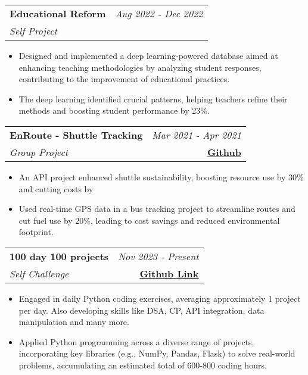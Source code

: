 \documentclass[a4paper,11pt]{article}
\makeatletter
\newcommand{\resumeProject}[4]{
\vspace{0.5mm}\item
    \begin{tabular*}{0.98\textwidth}[t]{l@{\extracolsep{\fill}}r}
        \textbf{#1} & \textit{\footnotesize{#3}} \\
        \footnotesize{\textit{#2}} & \footnotesize{#4}
    \end{tabular*}
    \vspace{-2.4mm}
}
\newcommand{\resumeItemListStart}{\begin{justify}\begin{itemize}[leftmargin=3ex, rightmargin=2ex, noitemsep,labelsep=1.2mm,itemsep=0mm]\small}
\newcommand{\resumeItemListEnd}{\end{itemize}\end{justify}\vspace{-2mm}}
\makeatother
\begin{document}
     
    \resumeProject
      {Educational Reform} %
      {Self Project} %
      {Aug 2022 - Dec 2022} %
      {\href{Github Link}{\textbf{}}} %
      \resumeItemListStart
        \item {Designed and implemented a deep learning-powered database aimed at enhancing teaching methodologies by analyzing student responses, contributing to the improvement of educational practices.}
        \item {The deep learning identified crucial patterns, helping teachers refine their methods and boosting student performance by 23\%.}
      \resumeItemListEnd
    
     
    \resumeProject
      {EnRoute - Shuttle Tracking} %
      {Group Project} %
      {Mar 2021 - Apr 2021} %
      {\href{https://github.com/TanmayAgarwal123/EnRoute}{\textbf{Github}}} %
      \resumeItemListStart
        \item {An API project enhanced shuttle sustainability, boosting resource use by 30\% and cutting costs by}
        \item {Used real-time GPS data in a bus tracking project to streamline routes and cut fuel use by 20\%, leading to cost savings and reduced environmental footprint.}
      \resumeItemListEnd
    
     
    \resumeProject
      {100 day 100 projects} %
      {Self Challenge} %
      {Nov 2023 - Present} %
      {\href{https://github.com/TanmayAgarwal123/100-day-of-code}{\textbf{Github Link}}} %
      \resumeItemListStart
        \item {Engaged in daily Python coding exercises, averaging approximately 1 project per day. Also developing skills like DSA, CP, API integration, data manipulation and many more.}
        \item {Applied Python programming across a diverse range of projects, incorporating key libraries (e.g., NumPy, Pandas, Flask) to solve real-world problems, accumulating an estimated total of 600-800 coding hours.}
      \resumeItemListEnd
    
     
\end{document}
